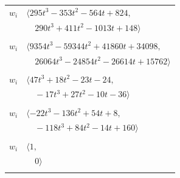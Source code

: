 \documentclass[11pt]{article}
\begin{document}
\begin{longtable}{@{}ll@{}}
$w_i$ & $\langle 295t^{3}-353t^{2}-564t+824,$\\
 & $\quad 290t^{3}+411t^{2}-1013t+148\rangle$\\
\addlinespace[2pt]
\multicolumn{2}{@{}p{0.97\textwidth}@{}}{$i=63$, $D_i=1$, $\rho_{ij}$: $6{:}1, \allowbreak 11{:}2, \allowbreak 14{:}2, \allowbreak 18{:}2, \allowbreak 19{:}1, \allowbreak 20{:}1, \allowbreak 27{:}2, \allowbreak 40{:}1, \allowbreak 59{:}2, \allowbreak 60{:}1, \allowbreak 61{:}2, \allowbreak 64{:}1, \allowbreak 71{:}2, \allowbreak 73{:}2, \allowbreak 75{:}1, \allowbreak 76{:}1, \allowbreak 79{:}2, \allowbreak 82{:}1, \allowbreak 87{:}2, \allowbreak 95{:}2, \allowbreak 96{:}1$}\\
$w_i$ & $\langle 9354t^{3}-59344t^{2}+41860t+34098,$\\
 & $\quad 26064t^{3}-24854t^{2}-26614t+15762\rangle$\\
\addlinespace[2pt]
\multicolumn{2}{@{}p{0.97\textwidth}@{}}{$i=64$, $D_i=1$, $\rho_{ij}$: $5{:}1, \allowbreak 10{:}1, \allowbreak 13{:}2, \allowbreak 26{:}1, \allowbreak 41{:}1, \allowbreak 47{:}2, \allowbreak 61{:}2, \allowbreak 63{:}2$}\\
$w_i$ & $\langle 47t^{3}+18t^{2}-23t-24,$\\
 & $\quad -17t^{3}+27t^{2}-10t-36\rangle$\\
\addlinespace[2pt]
\multicolumn{2}{@{}p{0.97\textwidth}@{}}{$i=65$, $D_i=1$, $\rho_{ij}$: $0{:}1, \allowbreak 1{:}1, \allowbreak 2{:}2, \allowbreak 5{:}2, \allowbreak 11{:}1, \allowbreak 18{:}1, \allowbreak 19{:}1, \allowbreak 55{:}2, \allowbreak 61{:}1, \allowbreak 67{:}2, \allowbreak 74{:}2, \allowbreak 82{:}1, \allowbreak 85{:}2, \allowbreak 86{:}2, \allowbreak 89{:}1$}\\
$w_i$ & $\langle -22t^{3}-136t^{2}+54t+8,$\\
 & $\quad -118t^{3}+84t^{2}-14t+160\rangle$\\
\addlinespace[2pt]
\multicolumn{2}{@{}p{0.97\textwidth}@{}}{$i=66$, $D_i=1$, $\rho_{ij}$: $--$}\\
$w_i$ & $\langle 1,$\\
 & $\quad 0\rangle$\\
\addlinespace[2pt]
\multicolumn{2}{@{}p{0.97\textwidth}@{}}{$i=67$, $D_i=1$, $\rho_{ij}$: $1{:}1, \allowbreak 3{:}2, \allowbreak 17{:}1, \allowbreak 19{:}1, \allowbreak 27{:}2, \allowbreak 37{:}1, \allowbreak 41{:}2, \allowbreak 61{:}1, \allowbreak 65{:}1, \allowbreak 68{:}2, \allowbreak 71{:}2, \allowbreak 79{:}1, \allowbreak 81{:}2, \allowbreak 84{:}1$}\\

\end{longtable}
\end{document}
